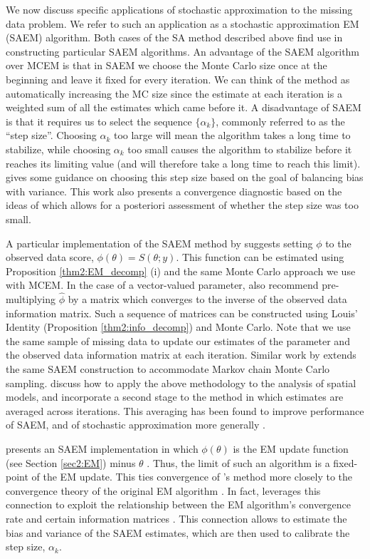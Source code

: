 \documentclass[11pt, oneside]{article}   	%
\begin{document}
We now discuss specific applications of stochastic approximation to the missing data problem. We refer to such an application as a stochastic approximation EM (SAEM) algorithm. Both cases of the SA method described above find use in constructing particular SAEM algorithms. An advantage of the SAEM algorithm over MCEM is that in SAEM we choose the Monte Carlo size once at the beginning and leave it fixed for every iteration. We can think of the method as automatically increasing the MC size since the estimate at each iteration is a weighted sum of all the estimates which came before it. A disadvantage of SAEM is that it requires us to select the sequence $\{ \alpha_k \}$, commonly referred to as the ``step size''. Choosing $\alpha_k$ too large will mean the algorithm takes a long time to stabilize, while choosing $\alpha_k$ too small causes the algorithm to stabilize before it reaches its limiting value (and will therefore take a long time to reach this limit). \citet{Jan06} gives some guidance on choosing this step size based on the goal of balancing bias with variance. This work also presents a convergence diagnostic based on the ideas of \citet{Caf05} which allows for a posteriori assessment of whether the step size was too small. 

A particular implementation of the SAEM method by \citet{Gu98I} suggests setting $\phi$ to the observed data score, $\phi(\theta) = S(\theta; y)$. This function can be estimated using Proposition \ref{thm2:EM_decomp} (i) and the same Monte Carlo approach we use with MCEM. In the case of a vector-valued parameter, \citeauthor{Gu98I} also recommend pre-multiplying $\hat{\phi}$ by a matrix which converges to the inverse of the observed data information matrix. Such a sequence of matrices can be constructed using Louis' Identity (Proposition \ref{thm2:info_decomp}) and Monte Carlo. Note that we use the same sample of missing data to update our estimates of the parameter and the observed data information matrix at each iteration. Similar work by \citet{Gu98II} extends the same SAEM construction to accommodate Markov chain Monte Carlo sampling. \citet{Gu01} discuss how to apply the above methodology to the analysis of spatial models, and incorporate a second stage to the method in which estimates are averaged across iterations. This averaging has been found to improve performance of SAEM, and of stochastic approximation more generally \citep{Pol92, Del99}.

\citet{Jan06} presents an SAEM implementation in which $\phi(\theta)$ is the EM update function (see Section \ref{sec2:EM}) minus $\theta$ \citep[see also][]{Del99}. Thus, the limit of such an algorithm is a fixed-point of the EM update. This ties convergence of \citeauthor{Jan06}'s method more closely to the convergence theory of the original EM algorithm \citep{Wu83}. In fact, \citeauthor{Jan06} leverages this connection to exploit the relationship between the EM algorithm's convergence rate and certain information matrices \citep{Men94}. This connection allows \citeauthor{Jan06} to estimate the bias and variance of the SAEM estimates, which are then used to calibrate the step size, $\alpha_k$.
\end{document}
